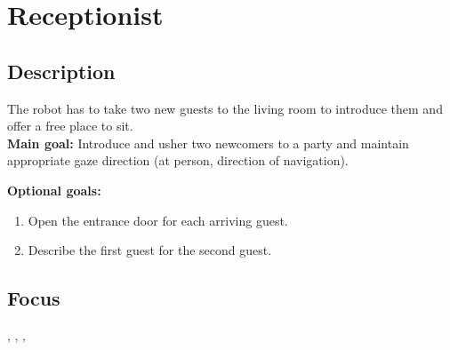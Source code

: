 \section{Receptionist}
\label{test:receptionist}
\subsection*{Description}
The robot has to take two new guests to the living room to introduce them and offer a free place to sit.\\
    
\textbf{Main goal:}
    Introduce and usher two newcomers to a party and maintain appropriate gaze direction (at person, direction of navigation).

\textbf{Optional goals:}
\begin{enumerate}[nosep]
	\item Open the entrance door for each arriving guest.
	\item Describe the first guest for the second guest.
\end{enumerate}

\subsection*{Focus}
\SysI{}, \HRI{}, \PerDet{}, \PerRec

